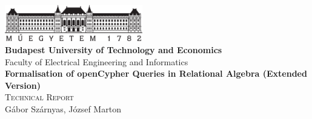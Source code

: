 \begin{titlepage}
	\begin{center}
		\includegraphics[width=60mm,keepaspectratio]{figures/bme-logo}\\
		\vspace{0.3cm}
		\textbf{Budapest University of Technology and Economics}\\
		\textmd{Faculty of Electrical Engineering and Informatics}\\[5cm]

		\vspace{0.4cm}
		{\huge \bfseries Formalisation of openCypher Queries in Relational Algebra (Extended Version)}\\[0.8cm]
		\vspace{0.5cm}
		\textsc{\Large Technical Report}\\[4cm]

		{\Large Gábor Szárnyas, József Marton}\\


		\vfill

	\end{center}
\end{titlepage}

\addtocounter{page}{1}
